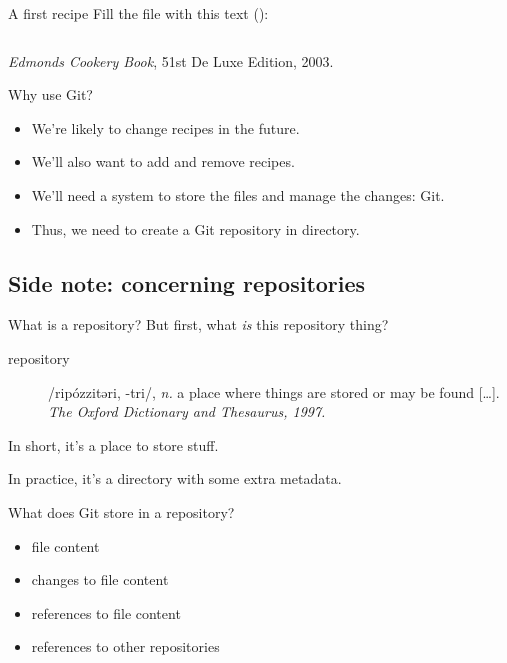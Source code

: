 \begin{frame}[fragile]{A first recipe}
    Fill the file with this text
    (\href{https://raw.githubusercontent.com/paultcochrane/git_course/refs/heads/master/git/examples/edmonds-chocolate-cake.md}{}):
    \inputminted[fontsize=\tiny]{markdown}{examples/edmonds-chocolate-cake.md}
    {\footnotesize \emph{Edmonds Cookery Book}, 51st De Luxe Edition, 2003.}
\end{frame}

\begin{frame}{Why use Git?}
    \begin{itemize}
        \item We're likely to change recipes in the future.
        \item We'll also want to add and remove recipes.
        \item We'll need a system to store the files and manage the changes: Git.
        \item Thus, we need to create a Git repository in
             directory.
    \end{itemize}
\end{frame}

\subsection{Side note: concerning repositories}

\begin{frame}{What is a repository?}
    But first, what \emph{is} this repository thing?

    \begin{description}
        \item[repository] /ripózzitəri, -tri/, \emph{n.} a place where
            things are stored or may be found [\ldots].
            \emph{The Oxford Dictionary and Thesaurus, 1997.}
    \end{description}

    In short, it's a place to store stuff.

    In practice, it's a directory with some extra metadata.

    What does Git store in a repository?
    \begin{itemize}
        \item file content
        \item changes to file content
        \item references to file content
        \item references to other repositories
    \end{itemize}
\end{frame}

